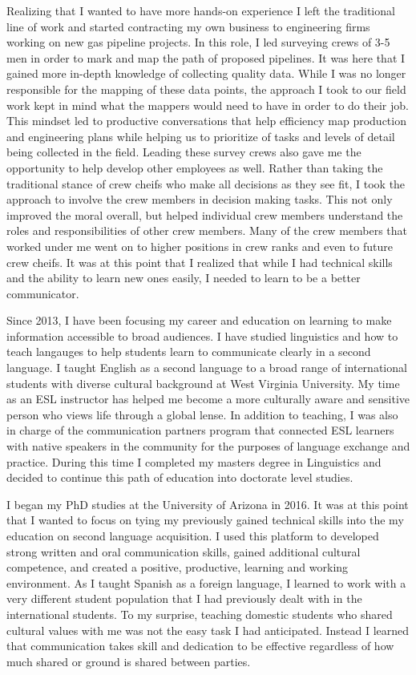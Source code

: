 \documentclass[12pt, letterpaper]{awesome-cv} %
\begin{document}
\begin{cvletter}
Realizing that I wanted to have more hands-on experience I left the traditional line of work and started contracting my own business to engineering firms working on new gas pipeline projects. In this role, I led surveying crews of 3-5 men in order to mark and map the path of proposed pipelines. It was here that I gained more in-depth knowledge of collecting quality data. While I was no longer responsible for the mapping of these data points, the approach I took to our field work kept in mind what the mappers would need to have in order to do their job. This mindset led to productive conversations that help efficiency map production and engineering plans while helping us to prioritize of tasks and levels of detail being collected in the field. Leading these survey crews also gave me the opportunity to help develop other employees as well. Rather than taking the traditional stance of crew cheifs who make all decisions as they see fit, I took the approach to involve the crew members in decision making tasks. This not only improved the moral overall, but helped individual crew members understand the roles and responsibilities of other crew members. Many of the crew members that worked under me went on to higher positions in crew ranks and even to future crew cheifs. It was at this point that I realized that while I had technical skills and the ability to learn new ones easily, I needed to learn to be a better communicator.

Since 2013, I have been focusing my career and education on learning to make information accessible to broad audiences. I have studied linguistics and how to teach langauges to help students learn to communicate clearly in a second language. I taught English as a second language to a broad range of international students with diverse cultural background at West Virginia University. My time as an ESL instructor has helped me become a more culturally aware and sensitive person who views life through a global lense. In addition to teaching, I was also in charge of the communication partners program that connected ESL learners with native speakers in the community for the purposes of language exchange and practice. During this time I completed my masters degree in Linguistics and decided to continue this path of education into doctorate level studies. 

I began my PhD studies at the University of Arizona in 2016. It was at this point that I wanted to focus on tying my previously gained technical skills into the my education on second language acquisition. I used this platform to developed strong written and oral communication skills, gained additional cultural competence, and created a positive, productive, learning and working environment. As I taught Spanish as a foreign language, I learned to work with a very different student population that I had previously dealt with in the international students. To my surprise, teaching domestic students who shared cultural values with me was not the easy task I had anticipated. Instead I learned that communication takes skill and dedication to be effective regardless of how much shared or ground is shared between parties. 


\end{cvletter}
\end{document}
